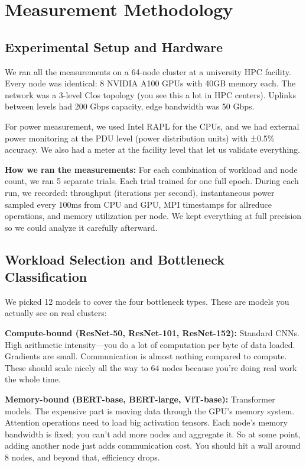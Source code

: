 \documentclass[conference]{IEEEtran}
\begin{document}
\section{Measurement Methodology}

\subsection{Experimental Setup and Hardware}

We ran all the measurements on a 64-node cluster at a university HPC facility. Every node was identical: 8 NVIDIA A100 GPUs with 40GB memory each. The network was a 3-level Clos topology (you see this a lot in HPC centers). Uplinks between levels had 200 Gbps capacity, edge bandwidth was 50 Gbps.

For power measurement, we used Intel RAPL for the CPUs, and we had external power monitoring at the PDU level (power distribution units) with ±0.5\% accuracy. We also had a meter at the facility level that let us validate everything.

\textbf{How we ran the measurements:} For each combination of workload and node count, we ran 5 separate trials. Each trial trained for one full epoch. During each run, we recorded: throughput (iterations per second), instantaneous power sampled every 100ms from CPU and GPU, MPI timestamps for allreduce operations, and memory utilization per node. We kept everything at full precision so we could analyze it carefully afterward.

\subsection{Workload Selection and Bottleneck Classification}

We picked 12 models to cover the four bottleneck types. These are models you actually see on real clusters:

\textbf{Compute-bound (ResNet-50, ResNet-101, ResNet-152):} Standard CNNs. High arithmetic intensity---you do a lot of computation per byte of data loaded. Gradients are small. Communication is almost nothing compared to compute. These should scale nicely all the way to 64 nodes because you're doing real work the whole time.

\textbf{Memory-bound (BERT-base, BERT-large, ViT-base):} Transformer models. The expensive part is moving data through the GPU's memory system. Attention operations need to load big activation tensors. Each node's memory bandwidth is fixed; you can't add more nodes and aggregate it. So at some point, adding another node just adds communication cost. You should hit a wall around 8 nodes, and beyond that, efficiency drops.
\end{document}
